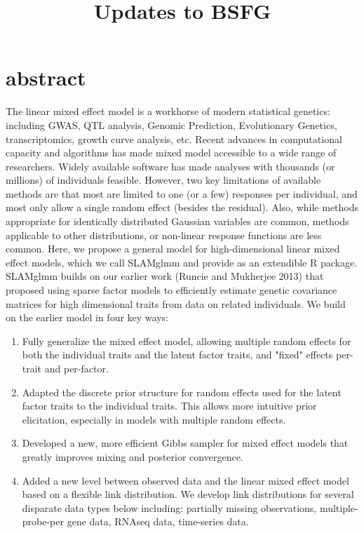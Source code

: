\documentclass[11pt]{amsart}
\title{Updates to BSFG}                %
\begin{document}
\maketitle

\section{abstract}
The linear mixed effect model is a workhorse of modern statistical genetics: including GWAS, QTL analysis, Genomic Prediction, Evolutionary Genetics, transcriptomics, growth curve analysis, etc. 
Recent advances in computational capacity and algorithms has made mixed model accessible to a wide range of researchers.
Widely available software has made analyses with thousands (or millions) of individuals feasible. However, two key limitations of
available methods are that most are limited to one (or a few) responses per individual, and most only allow a single random effect (besides the residual). Also, while methods appropriate for identically distributed Gaussian variables are common, methods applicable to other distributions, or non-linear response functions are less common. Here, we propose a general model for high-dimensional linear mixed effect models, which we call SLAMglmm and provide as an extendible R package. SLAMglmm builds on our earlier work (Runcie and Mukherjee 2013) that proposed using sparse factor models to efficiently estimate genetic covariance matrices for high dimensional traits from data on related individuals. We build on the earlier model in four key ways:

\begin{enumerate}
\item Fully generalize the mixed effect model, allowing multiple random effects for both the individual traits and the latent factor traits, and "fixed" effects per-trait and per-factor.
\item Adapted the discrete prior structure for random effects used for the latent factor traits to the individual traits. This allows more intuitive prior elicitation, especially in models with multiple random effects.
\item Developed a new, more efficient Gibbs sampler for mixed effect models that greatly improves mixing and posterior convergence.
\item Added a new level between observed data and the linear mixed effect model based on a flexible link distribution. We develop link distributions for several disparate data types below including: partially missing observations, multiple-probe-per gene data, RNAseq data, time-series data.
\end{enumerate}
\end{document}
